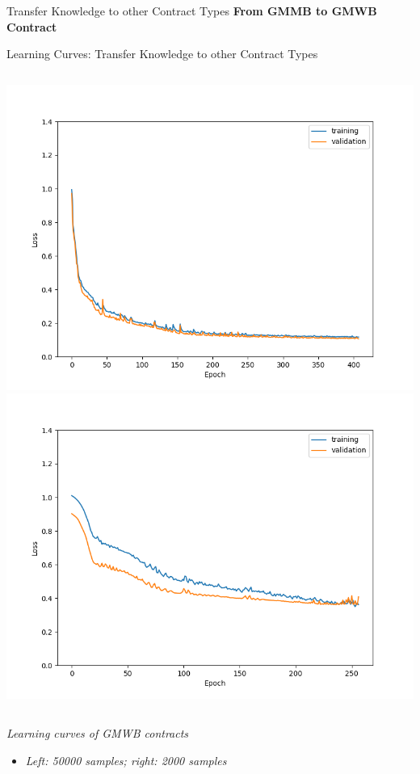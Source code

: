 \documentclass[9pt,handout]{beamer}
\begin{document}
    \begin{frame}{Transfer Knowledge to other Contract Types}
    \textbf{From GMMB to GMWB Contract}
    \end{frame}
    
    \begin{frame}{Learning Curves: Transfer Knowledge to other Contract Types}
    \begin{columns}
    \includegraphics[height=0.8\textheight]{../project3/figures/figure4a.png}
    \includegraphics[height=0.8\textheight]{../project3/figures/figure4b.png}
    \end{columns}
    
    \textit{Learning curves of GMWB contracts}
    \begin{itemize}
        \item \textit{Left: 50000 samples; right: 2000 samples}
    \end{itemize}
    \end{frame}
    
\end{document}
